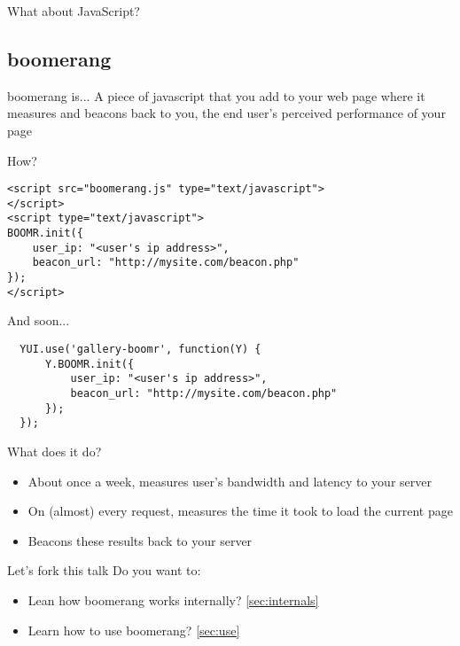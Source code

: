 \documentclass{beamer}
\begin{document}
\begin{frame}{}
  \begin{center}
  What about JavaScript?
  \end{center}
\end{frame}

\subsection{boomerang}

\begin{frame}
  \begin{block}{boomerang is...}
A piece of javascript that you add to your web page where it measures and beacons back to you, the end user's perceived performance of your page
  \end{block}
\end{frame}

\begin{frame}[fragile]{How?}
  \begin{verbatim}
<script src="boomerang.js" type="text/javascript">
</script>
<script type="text/javascript">
BOOMR.init({
    user_ip: "<user's ip address>",
    beacon_url: "http://mysite.com/beacon.php"
});
</script>
  \end{verbatim}
\end{frame}

\begin{frame}[fragile]{And soon...}
  \begin{verbatim}
  YUI.use('gallery-boomr', function(Y) {
      Y.BOOMR.init({
          user_ip: "<user's ip address>",
          beacon_url: "http://mysite.com/beacon.php"
      });
  });
  \end{verbatim}
\end{frame}

\begin{frame}{What does it do?}
  \begin{itemize}
  \item About once a week, measures user's bandwidth and latency to your server
  \item On (almost) every request, measures the time it took to load the current page
  \item Beacons these results back to your server
  \end{itemize}
\end{frame}

\begin{frame}{Let's fork this talk}
  Do you want to:
  \begin{itemize}
  \item Lean how boomerang works internally? \ref{sec:internals}
  \item Learn how to use boomerang? \ref{sec:use}
  \end{itemize}
\end{frame}
\end{document}
